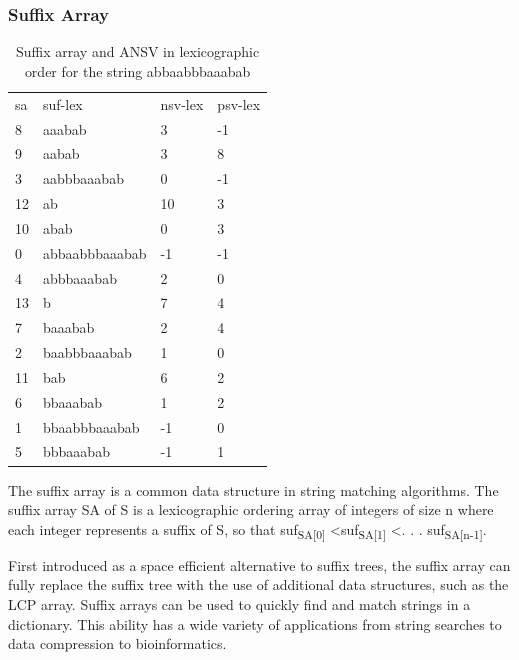 \subsubsection{Suffix Array}
\label{sec:sa}

\begin{table}[ht!]
\centering
\begin{tabular}{llll}
sa & suf-lex        & nsv-lex & psv-lex \\
8  & aaabab         & 3       & -1      \\
9  & aabab          & 3       & 8       \\
3  & aabbbaaabab    & 0       & -1      \\
12 & ab             & 10      & 3       \\
10 & abab           & 0       & 3       \\
0  & abbaabbbaaabab & -1      & -1      \\
4  & abbbaaabab     & 2       & 0       \\
13 & b              & 7       & 4       \\
7  & baaabab        & 2       & 4       \\
2  & baabbbaaabab   & 1       & 0       \\
11 & bab            & 6       & 2       \\
6  & bbaaabab       & 1       & 2       \\
1  & bbaabbbaaabab  & -1      & 0       \\
5  & bbbaaabab      & -1      & 1      
\end{tabular}
\caption{Suffix array and ANSV in lexicographic order for the string abbaabbbaaabab}
\label{tab:sa}
\end{table}

The suffix array is a common data structure in string matching algorithms.
The suffix array SA of S is a lexicographic ordering array of integers of size n where each integer represents a suffix of S, so that suf\textsubscript{SA[0]} \textless suf\textsubscript{SA[1]} \textless . . . suf\textsubscript{SA[n-1]}.

First introduced as a space efficient alternative to suffix trees, the suffix array can fully replace the suffix tree with the use of additional data structures, such as the LCP array.
Suffix arrays can be used to quickly find and match strings in a dictionary.
This ability has a wide variety of applications from string searches to data compression to bioinformatics.

